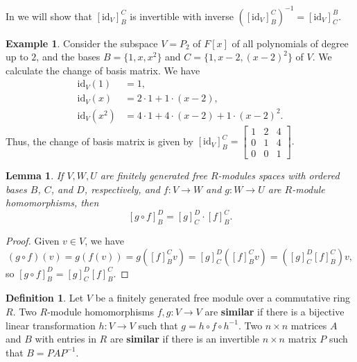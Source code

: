 \documentclass[12pt]{report}
\newtheorem{lemma}[theorem]{Lemma}
\numberwithin{equation}{section}
\numberwithin{theorem}{chapter}
\theoremstyle{definition}
\newtheorem{definition}[theorem]{Definition}
\newtheorem{example}[theorem]{Example}
\newtheorem*{basic properties}{Basic Properties}
\newtheorem*{Important Remark}{Important Remark}
\newcommand{\df}[1]{{\bf #1}\index{#1}}
\begin{document}
In  we will show that $[\mathrm{id}_V]_B^{C}$ is invertible with inverse $\left([\mathrm{id}_V]_B^{C}\right)^{-1}=[\mathrm{id}_V]_{C}^B$.

\begin{example}
Consider the subspace $V = P_2$ of $F[x]$ of all polynomials of degree up to $2$, and the bases $B = \{1, x, x^2\}$ and $C = \{1,x-2,(x-2)^2\}$ of $V$. We calculate the change of basis matrix. We have
$$\begin{aligned}
\mathrm{id}_V(1) &=1 ,\\
\mathrm{id}_V(x) &=2\cdot1+1\cdot(x-2), \\
\mathrm{id}_V(x^2) &=4\cdot1 +4\cdot(x-2)+1\cdot(x-2)^2.
\end{aligned}$$
Thus, the change of basis matrix is given by 
$[\mathrm{id}_V]_B^{C} = \begin{bmatrix}
1 & 2 & 4\\
0 & 1 & 4\\
0 & 0 & 1
\end{bmatrix}.$
\end{example}




 
\begin{lemma}\label{lem:matcompos}
 If $V,W,U$ are finitely generated free $R$-modules spaces with ordered bases $B$, $C$, and $D$, respectively, and $f\!: V \to W$ and $g\!: W \to U$ are $R$-module homomorphisms, then 
 $$[g\circ f]_B^D=[g]_C^D \cdot [f]_B^C.$$
\end{lemma}
 




\begin{proof}
Given $v \in V$, we have
$$(g \circ f)(v) = g(f(v))=g([f]_B^Cv)=[g]_C^D([f]_B^Cv)=([g]_C^D[f]_B^C)v,$$
so $[g \circ f]_B^D=[g]_C^D[f]_B^C$.
\end{proof} 


\begin{definition}
Let $V$ be a finitely generated free module over a commutative ring $R$. Two $R$-module homomorphisms $f,g: V \to V$ are \df{similar} if there is a bijective linear transformation $h: V \to V$ such that $g = h\circ f \circ h^{-1}$. Two $n \times n$ matrices $A$ and $B$ with entries in $R$ are \df{similar} if there is an invertible $n \times n$ matrix $P$ such that $B = PAP^{-1}$.
 \end{definition}
\end{document}

